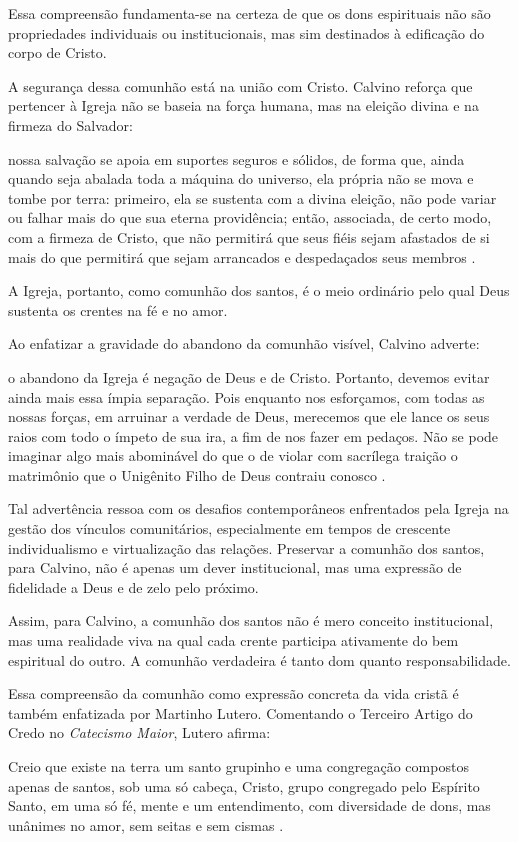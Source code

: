 Essa compreensão fundamenta-se na certeza de que os dons espirituais não são propriedades individuais ou institucionais, mas sim destinados à edificação do corpo de Cristo.

A segurança dessa comunhão está na união com Cristo. Calvino reforça que pertencer à Igreja não se baseia na força humana, mas na eleição divina e na firmeza do Salvador:
\begin{citacao}
nossa salvação se apoia em suportes seguros e sólidos, de forma que, ainda quando seja abalada toda a máquina do universo, ela própria não se mova e tombe por terra: primeiro, ela se sustenta com a divina eleição, não pode variar ou falhar mais do que sua eterna providência; então, associada, de certo modo, com a firmeza de Cristo, que não permitirá que seus fiéis sejam afastados de si mais do que permitirá que sejam arrancados e despedaçados seus membros \cite[v.~4, pp.~1863-1864]{calvino2022}.
\end{citacao}

A Igreja, portanto, como comunhão dos santos, é o meio ordinário pelo qual Deus sustenta os crentes na fé e no amor.

Ao enfatizar a gravidade do abandono da comunhão visível, Calvino adverte:
\begin{citacao}
o abandono da Igreja é negação de Deus e de Cristo. Portanto, devemos evitar ainda mais essa ímpia separação. Pois enquanto nos esforçamos, com todas as nossas forças, em arruinar a verdade de Deus, merecemos que ele lance os seus raios com todo o ímpeto de sua ira, a fim de nos fazer em pedaços. Não se pode imaginar algo mais abominável do que o de violar com sacrílega traição o matrimônio que o Unigênito Filho de Deus contraiu conosco \cite[v.~4, pp.~1877-1878]{calvino2022}.
\end{citacao}

Tal advertência ressoa com os desafios contemporâneos enfrentados pela Igreja na gestão dos vínculos comunitários, especialmente em tempos de crescente individualismo e virtualização das relações. Preservar a comunhão dos santos, para Calvino, não é apenas um dever institucional, mas uma expressão de fidelidade a Deus e de zelo pelo próximo.

Assim, para Calvino, a comunhão dos santos não é mero conceito institucional, mas uma realidade viva na qual cada crente participa ativamente do bem espiritual do outro. A comunhão verdadeira é tanto dom quanto responsabilidade.

Essa compreensão da comunhão como expressão concreta da vida cristã é também enfatizada por Martinho Lutero. Comentando o Terceiro Artigo do Credo no \textit{Catecismo Maior}, Lutero afirma:
\begin{citacao}
Creio que existe na terra um santo grupinho e uma congregação compostos apenas de santos, sob uma só cabeça, Cristo, grupo congregado pelo Espírito Santo, em uma só fé, mente e um entendimento, com diversidade de dons, mas unânimes no amor, sem seitas e sem cismas \cite[p.~454]{livroConcordia}.
\end{citacao}


